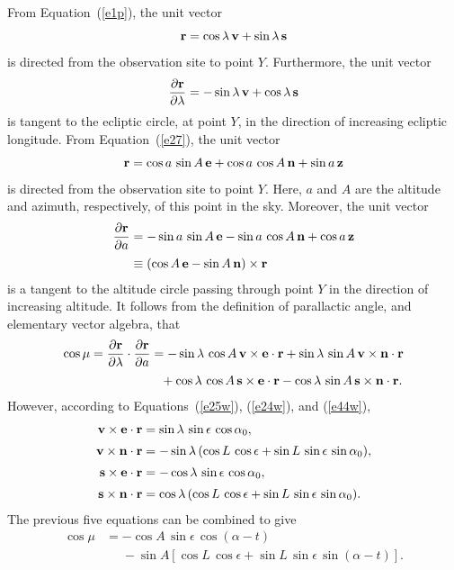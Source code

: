 From Equation~(\ref{e1p}), the unit vector
\begin{equation}\label{e44w}
{\bf r} = \cos\lambda\,{\bf v} + \sin \lambda\,{\bf s}
\end{equation}
is directed from the observation site to point $Y$. 
Furthermore, the unit vector
\begin{equation}
\frac{\partial {\bf r}}{\partial \lambda} = -\sin\lambda\,{\bf v} + \cos\lambda\,{\bf s}
\end{equation}
is  tangent  to the ecliptic circle, at  point $Y$, in the direction of  increasing ecliptic longitude. 
From  Equation~(\ref{e27}), the unit vector
\begin{equation}
{\bf r} = \cos a\,\sin A\,{\bf e}+ \cos a\,\cos A\,{\bf n} + \sin a \,{\bf z}
\end{equation}
is directed from the observation site to point $Y$. Here, $a$ and $A$ are the  altitude  and azimuth, respectively, of this
point in the sky. Moreover,
the unit vector
\begin{align}
\frac{\partial {\bf r}}{\partial a} &= -\sin a\,\sin A\,{\bf e}-\sin a\,\cos A\,{\bf n} +\cos a\,{\bf z}\nonumber\\[0.5ex]
&\equiv (\cos A \,{\bf e}-\sin A\,{\bf n})\times {\bf r}
\end{align}
is a tangent  to the altitude circle passing through point $Y$ in the direction of  increasing  altitude. It
follows from the definition of parallactic angle, and elementary vector algebra, that
\begin{align}
\cos \mu = \frac{\partial{\bf r}}{\partial\lambda}\cdot\frac{\partial {\bf r}}{\partial a} &= -\sin\lambda
\,\cos A\,{\bf v}\times{\bf e}\cdot{\bf r}+\sin\lambda\,\sin A\,{\bf v}\times{\bf n}\cdot{\bf r}\nonumber\\[0.5ex]
&\phantom{=}+\cos\lambda\,\cos A\,{\bf s}\times {\bf e}\cdot{\bf r} -\cos\lambda\,\sin A\,{\bf s}\times {\bf n}\cdot{\bf r}.
\end{align}
However, according to Equations~(\ref{e25w}), (\ref{e24w}), and (\ref{e44w}),
\begin{align}
{\bf v}\times {\bf e}\cdot{\bf r} &=\sin\lambda\,\sin \epsilon\,\cos\alpha_0,\\[0.5ex]
{\bf v}\times {\bf n}\cdot{\bf r}&=-\sin \lambda\,(\cos L\,\cos\epsilon + \sin L\,\sin \epsilon\,\sin \alpha_0),\\[0.5ex]
{\bf s}\times {\bf e}\cdot{\bf r} &=-\cos\lambda\,\sin \epsilon\,\cos\alpha_0,\\[0.5ex]
{\bf s}\times {\bf n}\cdot{\bf r} &=\cos\lambda\,(\cos L\,\cos\epsilon + \sin L\,\sin\epsilon\,\sin\alpha_0).
\end{align}
The previous five equations can be combined to give
\begin{align}\label{e45w}
\cos \mu &=-\cos A\,\sin\epsilon\,\cos(\alpha-t)\nonumber\\[0.5ex]
&\phantom{=} -\sin A\left[\cos L\,\cos\epsilon + \sin L\,\sin\epsilon\,\sin(\alpha-t)\right].
\end{align}

